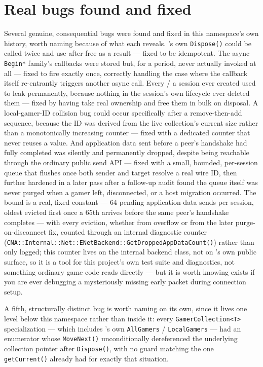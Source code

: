 \section{Real bugs found and fixed}

Several genuine, consequential bugs were found and fixed in this namespace's own history,
worth naming because of what each reveals. 's own
\texttt{Dispose()} could be called twice and use-after-free as a result --- fixed to be
idempotent. The async \texttt{Begin*} family's callbacks were stored but, for a period, never
actually invoked at all --- fixed to fire exactly once, correctly handling the case where the
callback itself re-entrantly triggers another async call. Every  /
 a session ever created used to leak permanently, because nothing
in the session's own lifecycle ever deleted them --- fixed by having 
take real ownership and free them in bulk on disposal. A local-gamer-ID collision bug could
occur specifically after a remove-then-add sequence, because the ID was derived from the
live collection's current size rather than a monotonically increasing counter --- fixed with a
dedicated counter that never reuses a value. And application data sent before a peer's
handshake had fully completed was silently and permanently dropped, despite being reachable
through the ordinary public send API --- fixed with a small, bounded, per-session queue that
flushes once both sender and target resolve a real wire ID, then further hardened in a later
pass after a follow-up audit found the queue itself was never purged when a gamer left,
disconnected, or a host migration occurred. The bound is a real, fixed constant --- 64 pending
application-data sends per session, oldest evicted first once a 65th arrives before the same
peer's handshake completes --- with every eviction, whether from overflow or from the later
purge-on-disconnect fix, counted through an internal diagnostic counter
(\texttt{CNA::Internal::Net::ENetBackend::GetDroppedAppDataCount()}) rather than only logged;
this counter lives on the internal backend class, not on 's own public
surface, so it is a tool for this project's own test suite and diagnostics, not something
ordinary game code reads directly --- but it is worth knowing exists if you are ever debugging
a mysteriously missing early packet during connection setup.

A fifth, structurally distinct bug is worth naming on its own, since it lives one level below
this namespace rather than inside it: every \texttt{GamerCollection<T>} specialization ---
which includes 's own \texttt{AllGamers} / \texttt{LocalGamers} --- had
an enumerator whose \texttt{MoveNext()} unconditionally dereferenced the underlying collection
pointer after \texttt{Dispose()}, with no guard matching the one \texttt{getCurrent()} already
had for exactly that situation.

